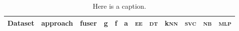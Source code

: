 \documentclass[11pt]{article}
\begin{document}
\begin{table*}[t]
  \centering
  \scriptsize
  \begin{tabular}{|l||l|c|c|c|c||l|l|l|l|l|l|}
  	\toprule
  	\bfseries Dataset & \bfseries approach & \bfseries fuser & \bfseries g & \bfseries f & \bfseries a & \textsc{ee} & \textsc{dt} & k\textsc{nn} & \textsc{svc} & \textsc{nb} & \textsc{mlp} \\
  	
  	\midrule
  	

    
    \bottomrule
  \end{tabular}
  \caption{Here is a caption.}
\end{table*}
\end{document}
